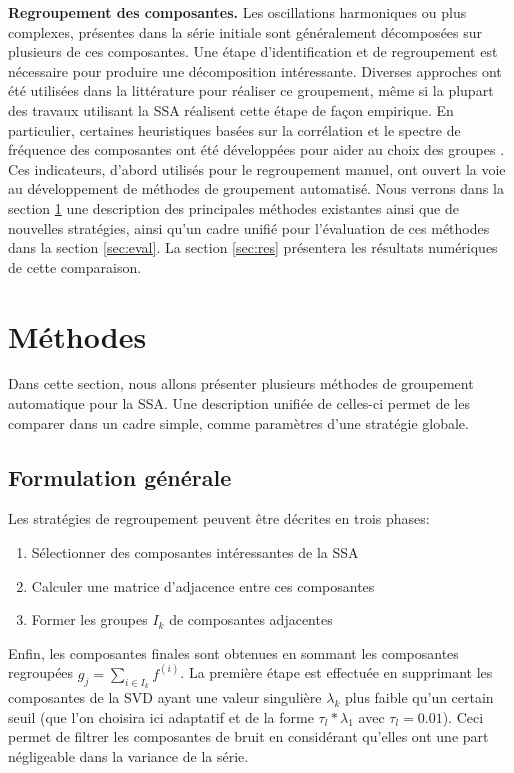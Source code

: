 \documentclass{gretsi}
\begin{document}
\textbf{Regroupement des composantes.}\label{sub:grp}
Les oscillations harmoniques ou plus complexes, présentes dans la série initiale sont généralement décomposées sur plusieurs de ces composantes.
Une étape d'identification et de regroupement est nécessaire pour produire une décomposition intéressante.
Diverses approches ont été utilisées dans la littérature pour réaliser ce groupement, même si la plupart des travaux utilisant la SSA réalisent cette étape de façon empirique.
En particulier, certaines heuristiques basées sur la corrélation et le spectre de fréquence des composantes ont été développées pour aider au choix des groupes \cite{Golyandina_10_ssa}.
Ces indicateurs, d'abord utilisés pour le regroupement manuel, ont ouvert la voie au développement de méthodes de groupement automatisé.
Nous verrons dans la section \ref{sec:met} une description des principales méthodes existantes ainsi que de nouvelles stratégies, ainsi qu'un cadre unifié pour l'évaluation de ces méthodes dans la section \ref{sec:eval}.
La section \ref{sec:res} présentera les résultats numériques de cette comparaison.


\section{Méthodes}
\label{sec:met}

Dans cette section, nous allons présenter plusieurs méthodes de groupement automatique pour la SSA.
Une description unifiée de celles-ci permet de les comparer dans un cadre simple, comme paramètres d'une stratégie globale.

\subsection{Formulation générale}
\label{sub:form}

Les stratégies de regroupement peuvent être décrites en trois phases:
\begin{enumerate}
	\item Sélectionner des composantes intéressantes de la SSA
	\item Calculer une matrice d'adjacence entre ces composantes
	\item Former les groupes $I_k$ de composantes adjacentes
\end{enumerate}
Enfin, les composantes finales sont obtenues en sommant les composantes regroupées $g_j = \sum_{i\in I_k} f^{(i)}$.
La première étape est effectuée en supprimant les composantes de la SVD ayant une valeur singulière $\lambda_k$ plus faible qu'un certain seuil (que l'on choisira ici adaptatif et de la forme  $\tau_l*\lambda_1$ avec $\tau_l = 0.01$).
Ceci permet de filtrer les composantes de bruit en considérant qu'elles ont une part négligeable dans la variance de la série.
\end{document}
